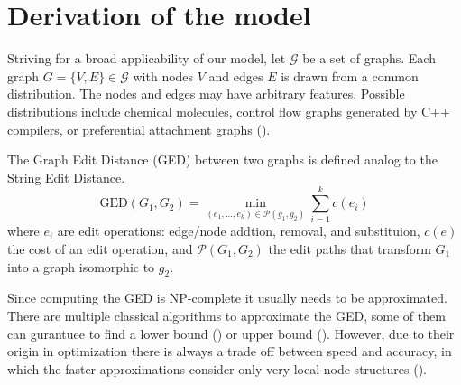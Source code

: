 \section{Derivation of the model}












Striving for a broad applicability of our model, let $\mathcal{G}$ be a set of graphs. Each graph $G = \{V, E\} \in \mathcal{G}$ with nodes $V$ and edges $E$ is drawn from a common distribution. The nodes and edges may have arbitrary features. Possible distributions include chemical molecules, control flow graphs generated by C++ compilers, or preferential attachment graphs (\citealp{pref_att2002}).

The Graph Edit Distance (GED) between two graphs is defined analog to the String Edit Distance.
\begin{equation}
     \text{GED}(G_{1},G_{2}) = \min_{(e_{1},...,e_{k}) \in \mathcal{P}(g_{1},g_{2})} \sum_{i=1}^{k} c(e_{i})
\end{equation}
where $e_{i}$ are edit operations: edge/node addtion, removal, and substituion, $c(e)$ the cost of an edit operation, and $\mathcal{P}(G_{1},G_{2})$ the edit paths that transform $G_{1}$ into a graph isomorphic to $g_{2}$.

Since computing the GED is NP-complete \cite{np_complete1998} it usually needs to be approximated. There are multiple classical algorithms to approximate the GED, some of them can gurantuee to find a lower bound (\cite{hungarian2009}) or upper bound (\citealp{hed2015}). However, due to their origin in optimization there is always a trade off between speed and accuracy, in which the faster approximations consider only very local node structures (\citealp{riba2018}).


